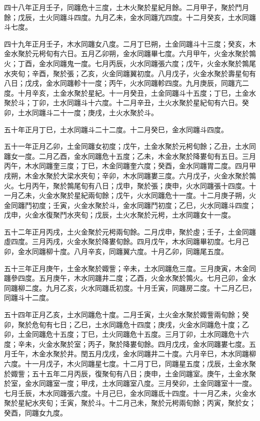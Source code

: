 \begin{pinyinscope}
四十八年正月壬子，同躔危十三度，土木火聚於星紀月餘。二月甲子，聚於鬥月餘；戊辰，土火同躔斗四度。九月乙未，金水同躔亢四度。十二月癸亥，土水同躔斗七度。

四十九年正月壬子，木水同躔女八度。二月丁巳朔，土金同躔斗十三度；癸亥，木金水聚於元枵旬有六日。五月乙卯朔，金水同躔畢七度。六月甲午，火金水聚於鶉火；丁酉，金水同躔鬼一度。七月丙辰，火水同躔張六度；戊午，火金水聚於鶉尾水夾旬；辛酉，聚於張；乙亥，火金同躔翼初度。八月戊子，火金水聚於壽星旬有八日；戊戌，金水同躔軫十一度；丙午，火水同躔軫四度。九月庚辰，同躔亢二度。十月辛亥，土金水聚於星紀。十一月癸丑，土金同躔斗十五度；丁巳，土金水聚於斗；丁卯，土水同躔斗十六度。十二月辛丑，土火水聚於星紀旬有六日。癸卯，土水同躔斗二十一度；庚戌，土火水聚於斗。

五十年正月丁巳，土水同躔斗二十二度。十二月癸巳，金水同躔斗四度。

五十一年正月乙卯，土金同躔女初度；戊午，土金水聚於元枵旬餘；乙丑，土水同躔女一度。二月乙酉，金水同躔危十五度；乙未，木金水聚於降婁旬有五日。三月丙午，木水同躔奎三度；丁巳，木金同躔奎六度；癸酉，金水同躔胃二度。四月甲戌朔，木金水聚於大梁水夾旬；辛卯，木水同躔婁三度。六月戊子，火金水聚於鶉火。七月丙午，聚於鶉尾旬有八日；戊申，聚於張；庚申，火水同躔張十四度。十一月乙未，火金水聚於星紀兩旬餘；戊午，火水同躔危十一度。十二月庚子朔，火金同躔鬥初度；壬寅，火金水聚於斗，金水同躔鬥初度；乙巳，火水同躔斗四度；戊申，火金水復聚鬥水夾旬；戊辰，土火水聚於元枵，土水同躔女十一度。

五十二年正月丙戌，土火金聚於元枵兩旬餘。二月戊申，聚於虛；壬子，土金同躔虛四度。三月丙戌，火金水聚於降婁旬餘。四月戊午，木水同躔畢初度。七月己卯，金水同躔柳十度。八月辛亥，同躔翼六度。十月乙卯，同躔尾五度。

五十三年正月庚午，土金水聚於娵訾；辛未，土水同躔危三度。三月庚寅，木金同躔參四度。五月庚午，木水同躔井二度；乙酉，火金水聚於鶉火。七月己卯，金水同躔柳二度。九月乙亥，火水同躔氐初度。十月壬寅，同躔房二度。十二月乙巳，同躔斗十二度。

五十四年正月乙亥，土水同躔危十度。二月壬寅，土火金水聚於娵訾兩旬餘；癸卯，聚於危旬有七日；乙巳，土水同躔危十四度；庚戌，火金水同躔危十度；乙卯，土金同躔危十五度；丁巳，土火同躔危十五度。三月丁卯，土水同躔危十六度；辛未，火金水聚於室；丙子，聚於降婁旬餘。四月戊戌，金水同躔婁七度。五月壬午，木金水聚於井。閏五月戊戌，金水同躔井二十度。六月辛巳，木水同躔柳六度。十一月戊子，木火同躔星七度。十二月丁巳，同躔星五度；戊辰，土金水聚於娵訾；五十五年二月丙辰，復聚旬有八日；庚申，土金同躔室。庚午，土金水聚於室，金水同躔室一度；甲戌，土水同躔室八度。三月癸卯，土金同躔室十一度。七月壬辰，木水同躔張六度。十月己巳，金水同躔氐十四度。十一月乙未，火金水聚於星紀水夾旬；壬寅，聚於斗。十二月己未，聚於元枵兩旬餘；丙寅，聚於女；癸酉，同躔女九度。


\end{pinyinscope}
